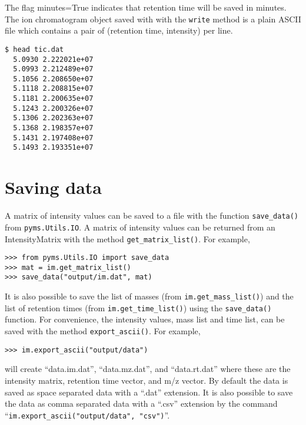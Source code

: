 \noindent
The flag minutes=True indicates that retention time will be saved in minutes.
The ion chromatogram object saved with with the {\tt write{}} method is a
plain ASCII file which contains a pair of (retention time, intensity) per
line.

\begin{verbatim}
$ head tic.dat
  5.0930 2.222021e+07
  5.0993 2.212489e+07
  5.1056 2.208650e+07
  5.1118 2.208815e+07
  5.1181 2.200635e+07
  5.1243 2.200326e+07
  5.1306 2.202363e+07
  5.1368 2.198357e+07
  5.1431 2.197408e+07
  5.1493 2.193351e+07
\end{verbatim}

%

\section{Saving data}


\noindent
A matrix of intensity values can be saved to a file with the function
{\tt save\_data()} from {\tt pyms.Utils.IO}. A matrix of intensity values can
be returned from an IntensityMatrix with the method {\tt get\_matrix\_list()}.
For example,

\begin{verbatim}
>>> from pyms.Utils.IO import save_data
>>> mat = im.get_matrix_list()
>>> save_data("output/im.dat", mat)
\end{verbatim}

It is also possible to save the list of masses (from {\tt im.get\_mass\_list()})
and the list of retention times (from {\tt im.get\_time\_list()}) using the
{\tt save\_data()} function. For convenience, the intensity values, mass list
 and time list, can be saved with the method {\tt export\_ascii()}. For example,

\begin{verbatim}
>>> im.export_ascii("output/data")
\end{verbatim}

\noindent
will create ``data.im.dat'', ``data.mz.dat'', and ``data.rt.dat'' where these
 are the intensity matrix, retention time vector, and m/z vector.
By default the data is saved as space separated data with a ``.dat'' extension.
It is also possible to save the data as comma separated data with a ``.csv''
extension by the command\\
``{\tt im.export\_ascii("output/data", "csv")}''.

